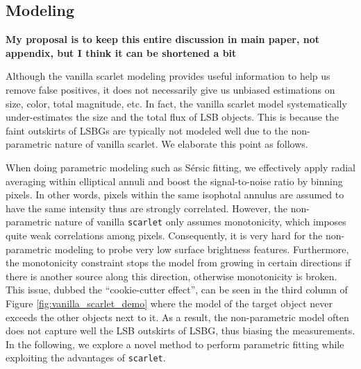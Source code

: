 \documentclass[twocolumn,astrosymb,twocolappendix]{aastex631}
\newcommand{\code}[1]{\texttt{#1}}
\newcommand{\sersic}{S\'ersic}
\begin{document}
\begin{CJK*}{UTF8}{gbsn}

\subsection{Modeling}\label{sec:modeling}

{\bf My proposal is to keep this entire discussion in main paper, not appendix, but I think it can be shortened a bit}

Although the vanilla scarlet modeling provides useful information to help us remove false positives, it does not necessarily give us unbiased estimations on size, color, total magnitude, etc. In fact, the vanilla scarlet model systematically under-estimates the size and the total flux of LSB objects. This is because the faint outskirts of LSBGs are typically not modeled well due to the non-parametric nature of vanilla scarlet. We elaborate this point as follows.

When doing parametric modeling such as \sersic{} fitting, we effectively apply radial averaging within elliptical annuli and boost the signal-to-noise ratio by binning pixels. In other words, pixels within the same isophotal annulus are assumed to have the same intensity thus are strongly correlated. However, the non-parametric nature of vanilla \code{scarlet} only assumes monotonicity, which imposes quite weak correlations among pixels. Consequently, it is very hard for the non-parametric modeling to probe very low surface brightness features. Furthermore, the monotonicity constraint stops the model from growing in certain directions if there is another source along this direction, otherwise monotonicity is broken. This issue, dubbed the ``cookie-cutter effect'', can be seen in the third column of Figure \ref{fig:vanilla_scarlet_demo} where the model of the target object never exceeds the other objects next to it. As a result, the non-parametric model often does not capture well the LSB outskirts of LSBG, thus biasing the measurements. In the following, we explore a novel method to perform parametric fitting while exploiting the advantages of \code{scarlet}.


\end{CJK*}
\end{document}
